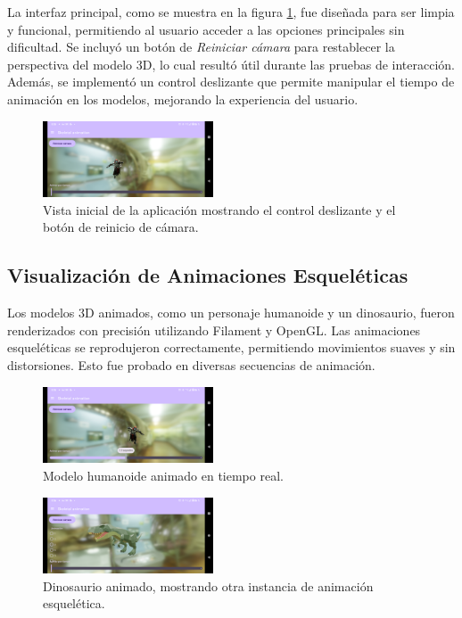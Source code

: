 \documentclass[conference]{IEEEtran}
\begin{document}
La interfaz principal, como se muestra en la figura \ref{fig:interfaz_inicial}, fue diseñada para ser limpia y funcional, permitiendo al usuario acceder a las opciones principales sin dificultad. Se incluyó un botón de \textit{Reiniciar cámara} para restablecer la perspectiva del modelo 3D, lo cual resultó útil durante las pruebas de interacción. Además, se implementó un control deslizante que permite manipular el tiempo de animación en los modelos, mejorando la experiencia del usuario.

\begin{figure}[H]
    \centering
    \includegraphics[width=0.45\textwidth]{img/Captura_1.png}
    \caption{Vista inicial de la aplicación mostrando el control deslizante y el botón de reinicio de cámara.}
    \label{fig:interfaz_inicial}
\end{figure}

\subsection{Visualización de Animaciones Esqueléticas}

Los modelos 3D animados, como un personaje humanoide y un dinosaurio, fueron renderizados \cite{pbrOverview} con precisión utilizando Filament y OpenGL. Las animaciones esqueléticas se reprodujeron correctamente, permitiendo movimientos suaves y sin distorsiones. Esto fue probado en diversas secuencias de animación.

\begin{figure}[H]
    \centering
    \includegraphics[width=0.45\textwidth]{img/Captura_2.png}
    \caption{Modelo humanoide animado en tiempo real.}
    \label{fig:modelo_humanoide}
\end{figure}

\begin{figure}[H]
    \centering
    \includegraphics[width=0.45\textwidth]{img/Captura_5.png}
    \caption{Dinosaurio animado, mostrando otra instancia de animación esquelética.}
    \label{fig:modelo_dinosaurio}
\end{figure}
\end{document}
